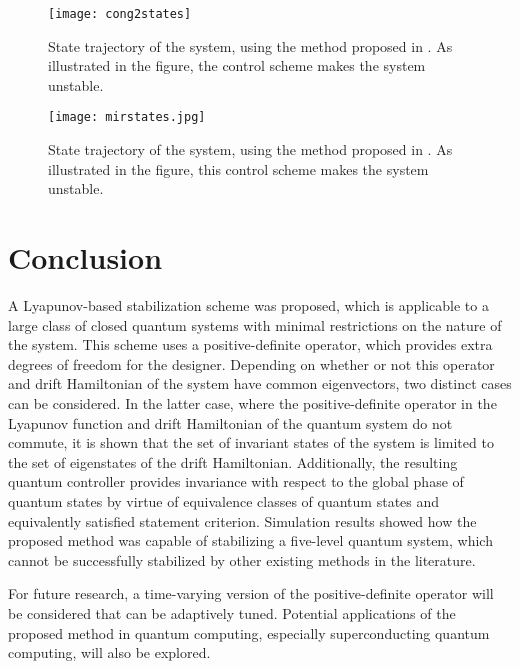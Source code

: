 \documentclass[journal]{IEEEtran}
\theoremstyle{definition}
\begin{document}
\begin{figure}
     \centering
     \texttt{[image: cong2states]}     \caption{State trajectory of the system, using the method proposed in \cite{kuang2008lyapunov}. As illustrated in the figure, the control scheme makes the system unstable.}
     \label{fig:333}
\end{figure}

\begin{figure}
     \centering
     \texttt{[image: mirstates.jpg]}
     \caption{State trajectory of the system, using the method proposed in \cite{mirrahimi2005lyapunov}. As illustrated in the figure, this control scheme makes the system unstable.}
     \label{fig:444}
\end{figure}{}
    
\section{Conclusion} 
\par 
A Lyapunov-based stabilization scheme was proposed, which is applicable to a large class of closed quantum systems with minimal restrictions on the nature of the system. This scheme uses a positive-definite operator, which provides extra degrees of freedom for the designer. Depending on whether or not this operator and drift Hamiltonian of the system have common eigenvectors, two distinct cases can be considered. In the latter case, where the positive-definite operator in the Lyapunov function and drift Hamiltonian of the quantum system do not commute, it is shown that the set of invariant states of the system is limited to the set of eigenstates of the drift Hamiltonian. Additionally, the resulting quantum controller provides invariance with respect to the global phase of quantum states by virtue of equivalence classes of quantum states and equivalently satisfied statement criterion. Simulation results showed how the proposed method was capable of stabilizing a five-level quantum system, which cannot be successfully stabilized by other existing methods in the literature.
\par
For future research, a time-varying version of the positive-definite operator will be considered that can be adaptively tuned. Potential applications of the proposed method in quantum computing, especially  superconducting quantum computing, will also be explored.
  


\end{document}
